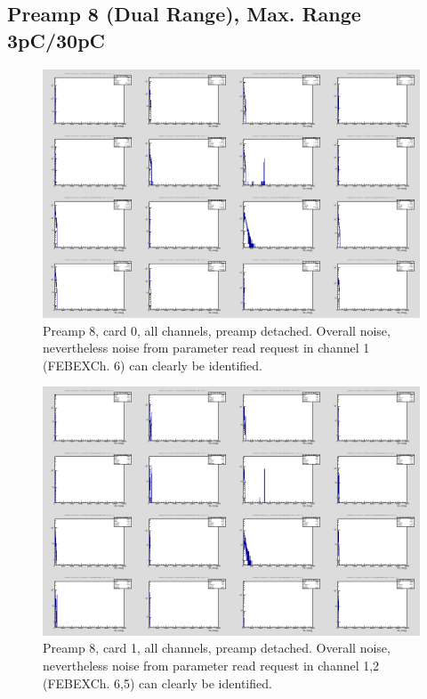 \documentclass{report}
\begin{document}
\newpage
\clearpage

\subsection{Preamp 8 (Dual Range), Max. Range 3pC/30pC}
\begin{figure}[!htb]
  \includegraphics[width=\linewidth]{rc_bus_test/preamp8_card0_gamma_all.png}
  \caption{Preamp 8, card 0, all channels, preamp detached. Overall noise, nevertheless noise from parameter read request in channel 1 (FEBEXCh. 6) can clearly be identified.}
\end{figure}
\begin{figure}[!htb]
  \includegraphics[width=\linewidth]{rc_bus_test/preamp8_card1_gamma_all.png}
  \caption{Preamp 8, card 1, all channels, preamp detached. Overall noise, nevertheless noise from parameter read request in channel 1,2 (FEBEXCh. 6,5) can clearly be identified.}
\end{figure}
\end{document}
